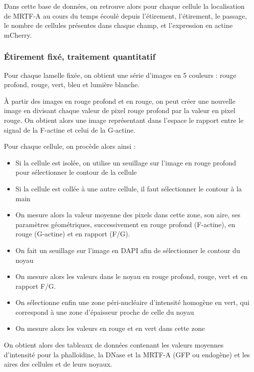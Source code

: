 	Dans cette base de données, on retrouve alors pour chaque cellule la localisation de MRTF-A au cours du temps écoulé depuis l'étirement, l'étirement, le passage, le nombre de cellules présentes dans chaque champ, et l'expression en actine mCherry.
	\subsubsection{\'Etirement fixé, traitement quantitatif}	
	
	Pour chaque lamelle fixée, on obtient une série d'images en 5 couleurs : rouge profond, rouge, vert, bleu et lumière blanche. 

À partir des images en rouge profond et en rouge, on peut créer une nouvelle image en divisant chaque valeur de pixel rouge profond par la valeur en pixel rouge. On obtient alors une image représentant dans l'espace le rapport entre le signal de la F-actine et celui de la G-actine.

Pour chaque cellule, on procède alors ainsi : 
\begin{itemize}
\item Si la cellule est isolée, on utilise un seuillage sur l'image en rouge profond pour sélectionner le contour de la cellule
\item Si la cellule est collée à une autre cellule, il faut sélectionner le contour à la main
\item On mesure alors la valeur moyenne des pixels dans cette zone, son aire, ses paramètres géométriques, 
successivement en rouge profond (F-actine), en rouge (G-actine) et en rapport (F/G). 
\item On fait un seuillage sur l'image en DAPI afin de sélectionner le contour du noyau
\item On mesure alors les valeurs dans le noyau en rouge profond, rouge, vert et en rapport F/G. 
\item On sélectionne enfin une zone péri-nucléaire d'intensité homogène en vert, qui correspond à une zone d'épaisseur proche de celle du noyau
\item On mesure alors les valeurs en rouge et en vert dans cette zone
\end{itemize}	
	
	On obtient alors des tableaux de données contenant les valeurs moyennes d'intensité pour la phalloïdine, la DNase et la MRTF-A (GFP ou endogène) et les aires des cellules et de leurs noyaux. 
	
